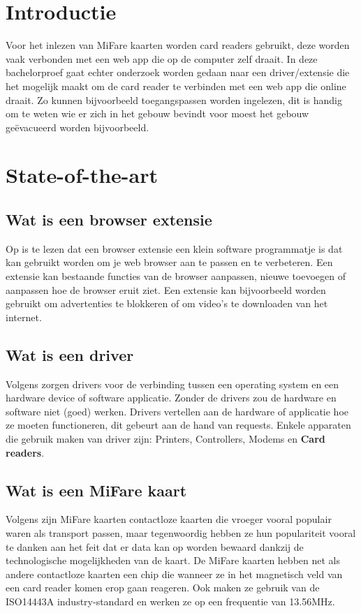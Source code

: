 
\section{Introductie}%
\label{sec:introductie}

Voor het inlezen van MiFare kaarten worden card readers gebruikt, deze worden vaak verbonden met een web app die op de computer zelf draait. In deze bachelorproef gaat echter onderzoek worden gedaan naar een driver/extensie die het mogelijk maakt om de card reader te verbinden met een web app die online draait. Zo kunnen bijvoorbeeld toegangspassen worden ingelezen, dit is handig om te weten wie er zich in het gebouw bevindt voor moest het gebouw geëvacueerd worden bijvoorbeeld.


\section{State-of-the-art}%
\label{sec:state-of-the-art}

\subsection{Wat is een browser extensie}
Op \textcite{Desktop.com} is te lezen dat een browser extensie een klein software programmatje is dat kan gebruikt worden om je web browser aan te passen en te verbeteren. Een extensie kan bestaande functies van de browser aanpassen, nieuwe toevoegen of aanpassen hoe de browser eruit ziet.
Een extensie kan bijvoorbeeld worden gebruikt om advertenties te blokkeren of om video's te downloaden van het internet.

\subsection{Wat is een driver}
Volgens \textcite{Webopedia} zorgen drivers voor de verbinding tussen een operating system en een hardware device of software applicatie. Zonder de drivers zou de hardware en software niet (goed) werken. Drivers vertellen aan de hardware of applicatie hoe ze moeten functioneren, dit gebeurt aan de hand van requests. Enkele apparaten die gebruik maken van driver zijn: Printers, Controllers, Modems en \textbf{Card readers}.

\subsection{Wat is een MiFare kaart}
Volgens \textcite{Digitalid} zijn MiFare kaarten contactloze kaarten die vroeger vooral populair waren als transport passen, maar tegenwoordig hebben ze hun populariteit vooral te danken aan het feit dat er data kan op worden bewaard dankzij de technologische mogelijkheden van de kaart.
De MiFare kaarten hebben net als andere contactloze kaarten een chip die wanneer ze in het magnetisch veld van een card reader komen erop gaan reageren. Ook maken ze gebruik van de ISO14443A industry-standard en werken ze op een frequentie van 13.56MHz.

